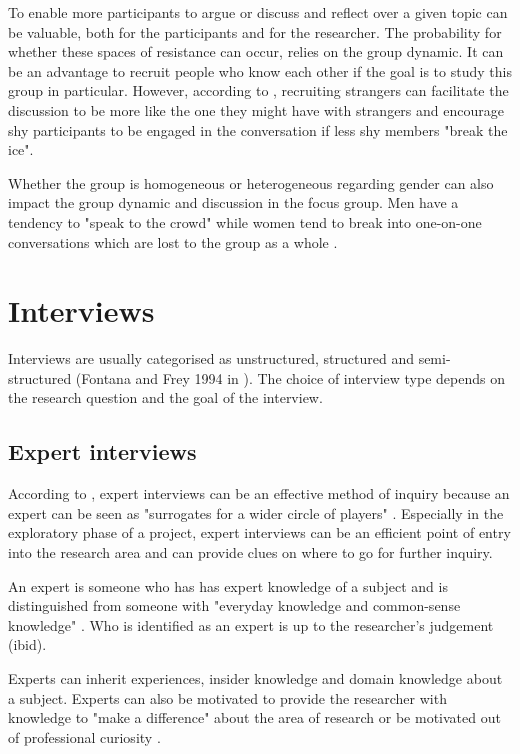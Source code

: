 To enable more participants to argue or discuss and reflect over a given topic can be valuable, both for the participants and for the researcher. The probability for whether these spaces of resistance can occur, relies on the group dynamic. It can be an advantage to recruit people who know each other if the goal is to study this group in particular. However, according to \textcite{CrangMike2007De}, recruiting strangers can facilitate the discussion to be more like the one they might have with strangers and encourage shy participants to be engaged in the conversation if less shy members "break the ice".

Whether the group is homogeneous or heterogeneous regarding gender can also impact the group dynamic and discussion in the focus group. Men have a tendency to "speak to the crowd" while women tend to break into one-on-one conversations which are lost to the group as a whole \parencite[92]{CrangMike2007De}.

\section{Interviews}
Interviews are usually categorised as unstructured, structured and semi-structured (Fontana and Frey 1994 in \cite{rogers_interaction_2011}). The choice of interview type depends on the research question and the goal of the interview.

\subsection{Expert interviews}
According to \citeauthor{meuser2009expert}, expert interviews can be an effective method of inquiry because an expert can be seen as "surrogates for a wider circle of players" \parencite[2]{meuser2009expert}. Especially in the exploratory phase of a project, expert interviews can be an efficient point of entry into the research area and can provide clues on where to go for further inquiry.  

An expert is someone who has has expert knowledge of a subject and is distinguished from someone with "everyday knowledge and common-sense knowledge" \parencite[18]{meuser2009expert}. Who is identified as an expert is up to the researcher's judgement (ibid). 

Experts can inherit experiences, insider knowledge and domain knowledge about a subject. Experts can also be motivated to provide the researcher with knowledge to "make a difference" about the area of research or be motivated out of professional curiosity \parencite{meuser2009expert}.

